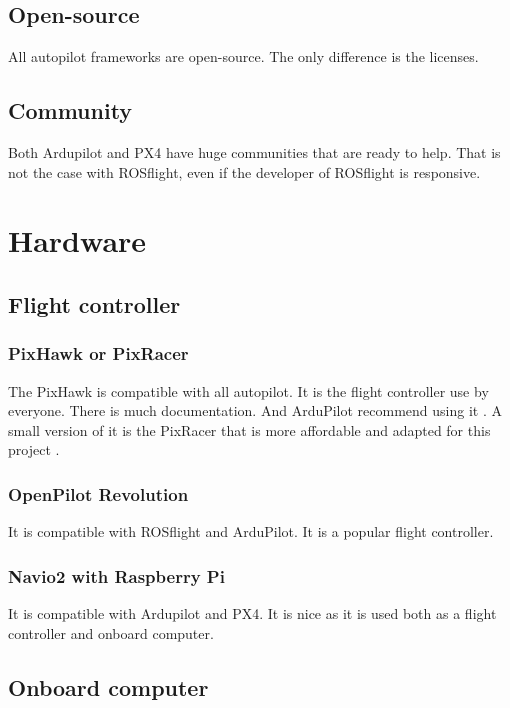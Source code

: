     \subsection{Open-source}
    All autopilot frameworks are open-source. The only difference is the licenses.

    \subsection{Community}
    Both Ardupilot and PX4 have huge communities that are ready to help.
    That is not the case with ROSflight, even if the developer of ROSflight is responsive.

\section{Hardware}

    \subsection{Flight controller}

        \subsubsection{PixHawk or PixRacer}
        The PixHawk is compatible with all autopilot.
        It is the flight controller use by everyone. There is much documentation. And ArduPilot recommend using it \cite{ardupilot_choose_fc}.
        A small version of it is the PixRacer that is more affordable and adapted for this project \cite{mrobotics_pixracer}.

        \subsubsection{OpenPilot Revolution}
        It is compatible with ROSflight and ArduPilot. It is a popular flight controller.

        \subsubsection{Navio2 with Raspberry Pi}
        It is compatible with Ardupilot and PX4. It is nice as it is used both as a flight controller and onboard computer.

    \subsection{Onboard computer}

